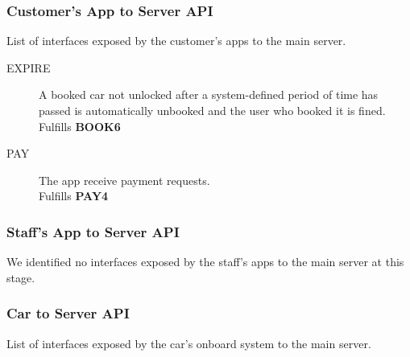 \documentclass[11pt]{article} %
\begin{document}
\subsubsection{Customer's App to Server API}
List of interfaces exposed by the customer's apps to the main server.
\begin{description}
	\item[EXPIRE] A booked car not unlocked after a system-defined period of time has passed is automatically unbooked and the user who booked it is fined. \\ Fulfills \textbf{BOOK6}
	\item[PAY] The app receive payment requests. \\ Fulfills \textbf{PAY4}
\end{description}


\subsubsection{Staff's App to Server API}
We identified no interfaces exposed by the staff's apps to the main server at this stage.


\subsubsection{Car to Server API}
List of interfaces exposed by the car's onboard system to the main server.
\end{document}
